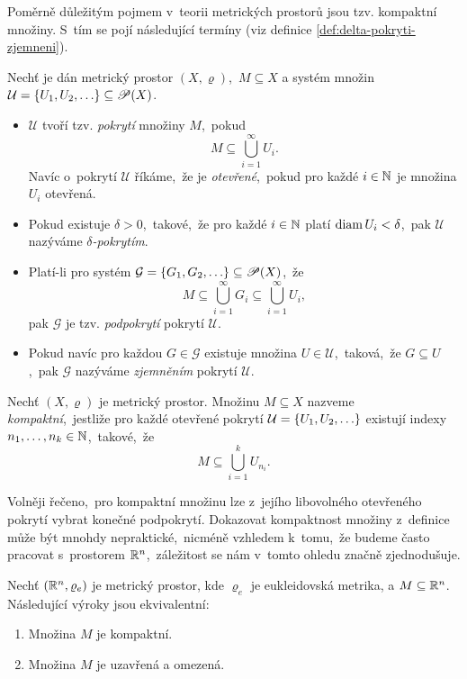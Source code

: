 Poměrně důležitým pojmem v~teorii metrických prostorů jsou tzv. kompaktní množiny. S~tím se pojí následující termíny (viz definice \ref{def:delta-pokryti-zjemneni}).
\begin{definition}\label{def:delta-pokryti-zjemneni}
    Nechť je dán metrický prostor $(X,\varrho)$,~$M\subseteq X$ a systém množin $\mathcal{U}=\left\{U_1,U_2,\ldots\right\}\subseteq\mathscr{P}(X)$.
    \begin{itemize}
        \item $\mathcal{U}$ tvoří tzv. \emph{pokrytí} množiny $M$,~pokud
        \[M\subseteq\bigcup_{i=1}^\infty U_i.\]
        Navíc o~pokrytí $\mathcal{U}$ říkáme,~že je \emph{otevřené},~pokud pro každé $i\in\mathbb{N}$ je množina $U_i$ otevřená.
        \item Pokud existuje $\delta>0$,~takové,~že pro každé $i\in\mathbb{N}$ platí $\operatorname{diam}{U_i}<\delta$,~pak $\mathcal{U}$ nazýváme \emph{$\delta$-pokrytím}.
        \item Platí-li pro systém $\mathcal{G}=\left\{G_1,G_2,\ldots\right\}\subseteq\mathscr{P}(X)$,~že
        \[M\subseteq\bigcup_{i=1}^\infty G_i\subseteq\bigcup_{i=1}^\infty U_i,\]
        pak $\mathcal{G}$ je tzv. \emph{podpokrytí} pokrytí $\mathcal{U}$.
        \item Pokud navíc pro každou $G\in\mathcal{G}$ existuje množina $U\in\mathcal{U}$,~taková,~že $G\subseteq U$,~pak $\mathcal{G}$ nazýváme \emph{zjemněním} pokrytí $\mathcal{U}$. 
    \end{itemize}
\end{definition}
\begin{definition}\label{def:kompaktni-mnozina}
    Nechť $(X,\varrho)$ je metrický prostor. Množinu $M\subseteq X$ nazveme \emph{kompaktní},~jestliže pro každé otevřené pokrytí $\mathcal{U}=\left\{U_1,U_2,\ldots\right\}$ existují indexy $n_1,\ldots,n_k\in\mathbb{N}$,~takové,~že
    \[M\subseteq\bigcup_{i=1}^k U_{n_i}.\]
\end{definition}
Volněji řečeno,~pro kompaktní množinu lze z~jejího libovolného otevřeného pokrytí vybrat konečné podpokrytí. Dokazovat kompaktnost množiny z~definice může být mnohdy nepraktické,~nicméně vzhledem k~tomu,~že budeme často pracovat s~prostorem $\mathbb{R}^n$,~záležitost se nám v~tomto ohledu značně zjednodušuje.
\begin{theorem}\label{thm:heine-borel}
    Nechť $(\mathbb{R}^n,\varrho_e)$ je metrický prostor, kde $\varrho_e$ je eukleidovská metrika, a $M\subseteq\mathbb{R}^n$. Následující výroky jsou ekvivalentní:
    \begin{enumerate}[label=(\roman*)]
        \item Množina $M$ je kompaktní.
        \item Množina $M$ je uzavřená a omezená.
    \end{enumerate}
\end{theorem}
